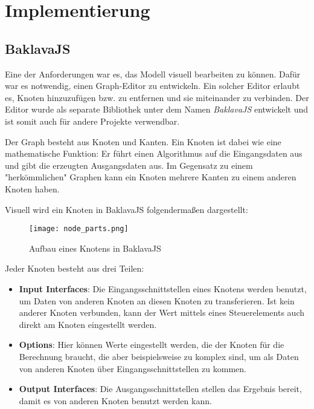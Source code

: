 
\chapter{Implementierung}

\section{BaklavaJS}

Eine der Anforderungen war es, das Modell visuell bearbeiten zu können. Dafür war es notwendig, einen Graph-Editor zu entwickeln. Ein solcher Editor erlaubt es, Knoten hinzuzufügen bzw. zu entfernen und sie miteinander zu verbinden. Der Editor wurde als separate Bibliothek unter dem Namen \textit{BaklavaJS} entwickelt und ist somit auch für andere Projekte verwendbar.

Der Graph besteht aus Knoten und Kanten. Ein Knoten ist dabei wie eine mathematische Funktion: Er führt einen Algorithmus auf die Eingangsdaten aus und gibt die erzeugten Ausgangsdaten aus. Im Gegensatz zu einem "herkömmlichen" Graphen kann ein Knoten mehrere Kanten zu einem anderen Knoten haben.

Visuell wird ein Knoten in BaklavaJS folgendermaßen dargestellt:

\begin{figure}[H]
    \centering
    \texttt{[image: node\_parts.png]}
    \caption{Aufbau eines Knotens in BaklavaJS}
    \label{fig:nodeparts}
\end{figure}

Jeder Knoten besteht aus drei Teilen:
\begin{itemize}
    \item \textbf{Input Interfaces}: Die Eingangsschnittstellen eines Knotens werden benutzt, um Daten von anderen Knoten an diesen Knoten zu transferieren. Ist kein anderer Knoten verbunden, kann der Wert mittels eines Steuerelements auch direkt am Knoten eingestellt werden.
    \item \textbf{Options}: Hier können Werte eingestellt werden, die der Knoten für die Berechnung braucht, die aber beispielsweise zu komplex sind, um als Daten von anderen Knoten über Eingangsschnittstellen zu kommen.
    \item \textbf{Output Interfaces}: Die Ausgangsschnittstellen stellen das Ergebnis bereit, damit es von anderen Knoten benutzt werden kann.
\end{itemize}

